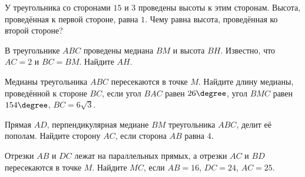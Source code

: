 \begin{homework}[number=2]
	\begin{listofex}
		\item У треугольника со сторонами \( 15 \) и \( 3 \) проведены высоты к этим сторонам. Высота, проведённая к первой стороне, равна \( 1 \). Чему равна высота, проведённая ко второй стороне?
		\item В треугольнике \( ABC \) проведены медиана \( BM \) и высота \( BH \). Известно, что \( AC=2 \) и \( BC=BM \). Найдите \( AH \).
		\item Медианы треугольника \( ABC \) пересекаются в точке \( M \). Найдите длину медианы, проведённой к стороне \( BC \), если угол \( BAC \) равен \( 26\degree \), угол \( BMC \) равен \( 154\degree \), \( BC=6\sqrt{3} \).
		\item Прямая \( AD \), перпендикулярная медиане \( BM \) треугольника \( ABC \), делит её пополам. Найдите сторону \( AC \), если сторона \( AB \) равна \( 4 \).
		\item Отрезки \( AB \) и \( DC \) лежат на параллельных прямых, а отрезки \( AC \) и \( BD \) пересекаются в точке \( M \). Найдите \( MC \), если \( AB=16 \), \( DC=24 \), \( AC=25 \).
	\end{listofex}
\end{homework}

